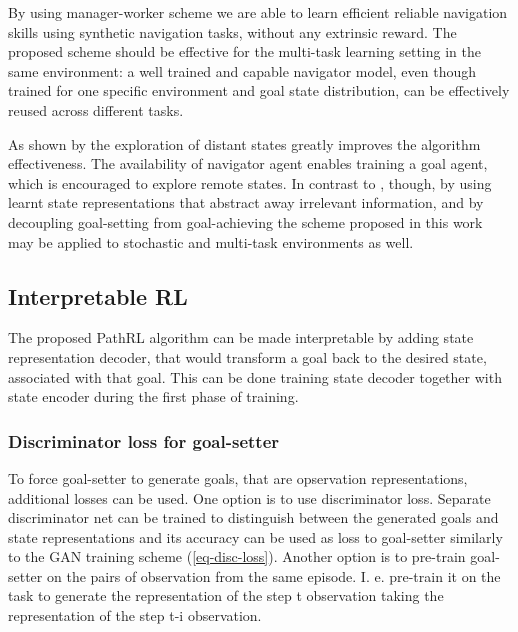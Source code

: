 \documentclass[acmsmall, nonacm]{acmart}
\begin{document}
By using manager-worker scheme we are able to learn efficient reliable navigation skills using synthetic navigation tasks, 
without any extrinsic reward.
%
The proposed scheme should be effective for the multi-task learning setting in the same environment: a well trained and capable navigator model, even though trained for one specific environment and goal state distribution, can be effectively reused across different tasks.

As shown by \citet{ecoffet_first_2021} the exploration of distant states greatly improves the algorithm effectiveness. The availability of navigator agent enables training a goal agent, which is encouraged to explore remote states.
%
In contrast to \citep{ecoffet_first_2021}, though, by using learnt state representations that abstract away irrelevant information, and by decoupling goal-setting from goal-achieving the scheme proposed in this work may be applied to stochastic and multi-task environments as well.

\subsection{Interpretable RL}

The proposed PathRL algorithm can be made interpretable by adding state representation decoder, that would transform a goal back to the desired state, associated with that goal. This can be done training state decoder together with state encoder during the first phase of training.

\subsubsection{Discriminator loss for goal-setter}

To force goal-setter to generate goals, that are opservation representations, additional losses can be used. One option is to use discriminator loss. Separate discriminator net can be trained to distinguish between the generated goals and state representations and its accuracy can be used as loss to goal-setter similarly to the GAN training scheme (\ref{eq-disc-loss}). Another option is to pre-train goal-setter on the pairs of observation from the same episode. I. e. pre-train it on the task to generate the representation of the step t observation taking the representation of the step t-i observation.
\end{document}
